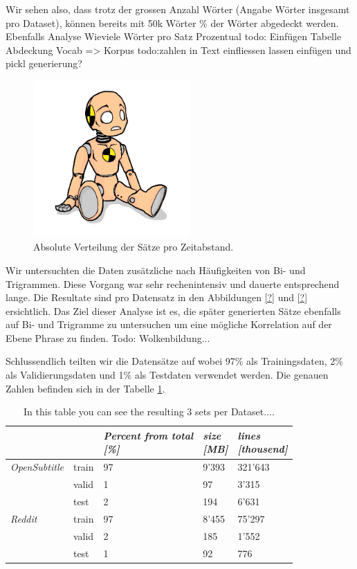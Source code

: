 Wir sehen also, dass trotz der grossen Anzahl Wörter (Angabe Wörter insgesamt pro Dataset), können bereits mit 50k Wörter \% der Wörter abgedeckt werden.
Ebenfalls Analyse Wieviele Wörter pro Satz Prozentual
todo: Einfügen Tabelle Abdeckung Vocab => Korpus
todo:zahlen in Text einfliessen lassen einfügen und pickl generierung?
\begin{figure}[h]
	\label{fig:data:analyse:timediff:opus}
	\centering
	\includegraphics[width=6cm]{img/dummy.png}
	\caption{Absolute Verteilung der Sätze pro Zeitabstand. \protect\footnotemark}
\end{figure}


Wir untersuchten die Daten zusätzliche nach Häufigkeiten von Bi- und Trigrammen. Diese Vorgang war sehr rechenintensiv und dauerte entsprechend lange. Die Resultate sind pro Datensatz in den Abbildungen \ref{?} und \ref{?} ersichtlich. Das Ziel dieser Analyse ist es, die später generierten Sätze ebenfalls auf Bi- und Trigramme zu untersuchen um eine mögliche Korrelation auf der Ebene Phrase zu finden.
Todo: Wolkenbildung...

Schlussendlich teilten wir die Datensätze auf wobei 97\% als Trainingsdaten, 2\% als Validierungsdaten und 1\% als Testdaten verwendet werden. Die genauen Zahlen befinden sich in der Tabelle \ref{tbl:data:split:corpus}.
\begin{table}[H]
	\begin{adjustbox}{max width=\textwidth}
		\centering
		\small
		\begin{tabular}{lllll}
			\toprule
			&  \specialcell{\emph{set}}
			&  \specialcell{\emph{Percent from total} \\\textit{[\%]}}
			&  \specialcell{\emph{size} \\\textit{[MB]}}
			&  \specialcell{\emph{lines} \\\textit{[thousend]}}\\
			\midrule
			\emph{OpenSubtitle}		&train	&97	&9'393	&321'643	\\
							&valid	&1	&97		&3'315	\\
							&test	&2	&194	&6'631	\\
			\emph{Reddit}	&train	&97	&8'455	&75'297	\\
							&valid	&2	&185	&1'552	\\
							&test	&1	&92		&776	\\
			\bottomrule
		\end{tabular}
	\end{adjustbox}
	\caption{In this table you can see the resulting 3 sets per Dataset....}
	\label{tbl:data:split:corpus}
\end{table}

